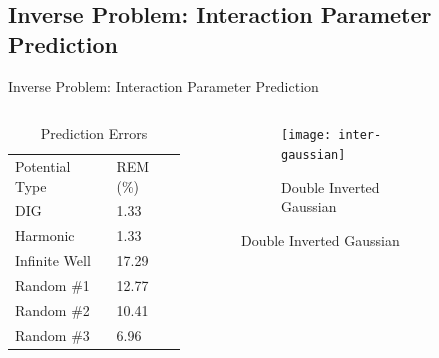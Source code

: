 \documentclass{beamer}
\begin{document}
\subsection{Inverse Problem: Interaction Parameter Prediction}
\begin{frame}{Inverse Problem: Interaction Parameter Prediction}
    \begin{columns}
        \begin{column}{0.4\textwidth}
            \begin{table}[]
                \centering
                \caption{Prediction Errors}
                \begin{tabular}{ll}
                    Potential Type & REM (\%) \\
                    DIG            & 1.33     \\
                    Harmonic       & 1.33     \\
                    Infinite Well  & 17.29    \\
                    Random \#1     & 12.77    \\
                    Random \#2     & 10.41    \\
                    Random \#3     & 6.96                    
                \end{tabular}
            \end{table}
        \end{column}
        \begin{column}{0.8\textwidth}
        \graphicspath{{"../figs/training/interaction/"}}
        \begin{figure}[H]
            \begin{subfigure}[t]{0.80\textwidth}
                \texttt{[image: inter-gaussian]}
            \caption{Double Inverted Gaussian}
            \end{subfigure}
        \end{figure}
        \end{column}
    \end{columns}
\end{frame}
\end{document}
